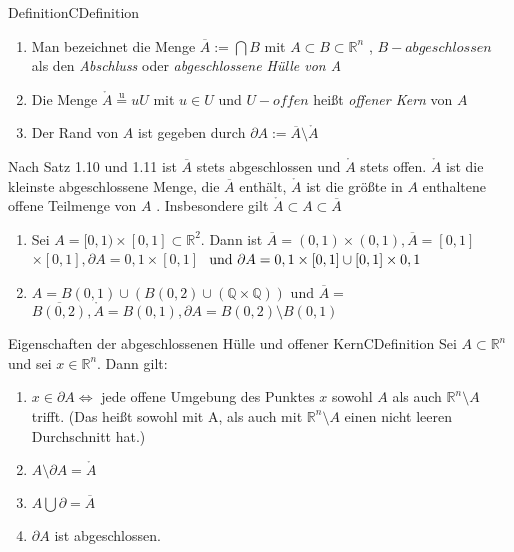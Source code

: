 \documentclass[11.5 pt, a4paper]{memoir}
\begin{document}
\begin{ibox}{Definition}{CDefinition}
    \begin{enumerate}[label=\alph*)]
        \item Man bezeichnet die Menge $ \overline{A}:= \bigcap B $ mit $ A \subset B \subset \mathbb{R}^n$ , $ B-abgeschlossen $ als den
            \textit{Abschluss} oder \textit{abgeschlossene Hülle von A}
        \item Die Menge $ \mathring{A} \stackrel{\text{u}}{=} uU $ mit $ u \in U$ und $ U-offen $ heißt \textit{offener Kern} von $ A $
        \item Der Rand von $ A $ ist gegeben durch $ \partial A := \overline{A} \setminus \mathring{A} $ 
    \end{enumerate}
\end{ibox}

Nach Satz 1.10 und 1.11 ist $ \overline{A} $ stets abgeschlossen und $ \mathring{A} $ stets offen. $ \mathring{A} $ ist die kleinste
abgeschlossene Menge, die $ \overline{A} $ enthält, $ \mathring{A} $ ist die größte in $ A $ enthaltene offene Teilmenge von $ A $ .
Insbesondere gilt $ \mathring{A} \subset A \subset \overline{A} $ 

\begin{enumerate}[label=\alph*)]
    \item Sei $ A = [0,1) \times [0,1] \subset \mathbb{R}^{2}$. Dann ist $ \overline{A} = (0,1) \times (0,1), \overline{A} = [0,1]$
       $ \times [0,1], \partial A = {0,1} \times [0,1]$
       $  \\ \text{ und } \partial A = {0,1} \times [0,1] \cup [0,1] \times {0,1}$  
    \item $ A = B(0,1) \cup \left( B(0,2) \cup \left( \mathbb{Q} \times \mathbb{Q} \right)  \right) \text{ und } \overline{A} =$
        $\overline{B(0,2)}, \mathring{A} = B(0,1), \partial A = B(0,2) \setminus B(0,1)$
\end{enumerate}
\begin{ibox}{Eigenschaften der abgeschlossenen Hülle und offener Kern}{CDefinition}
    \newline
    Sei $ A \subset \mathbb{R}^n $ und sei $ x \in \mathbb{R}^n $. Dann gilt:
    \begin{enumerate}[label=\alph*)]
        \item $ x \in \partial A \iff $ jede offene Umgebung des Punktes $ x $ sowohl $ A $ als auch $ \mathbb{R}^n \setminus A $ trifft.
            (Das heißt sowohl mit A, als auch mit $ \mathbb{R}^n \setminus A $ einen nicht leeren Durchschnitt hat.)
        \item $ A \setminus \partial A = \mathring{A}$
        \item $ A \bigcup \partial = \overline{A} $ 
        \item $ \partial A $ ist abgeschlossen.
    \end{enumerate}
\end{ibox}
\end{document}
